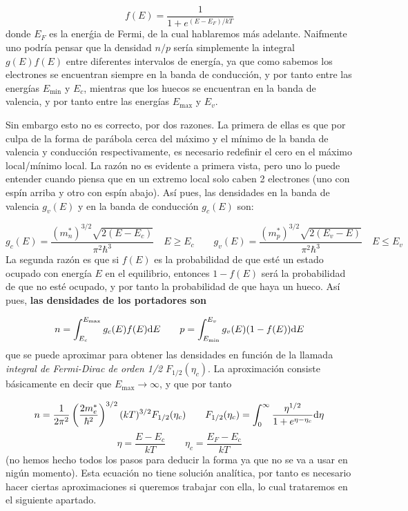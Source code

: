 \begin{equation}
	f(E) = \frac{1}{1+e^{(E-E_F)/kT}}
\end{equation}
donde $E_F$ es la enerǵia de Fermi, de la cual hablaremos más adelante. Naifmente uno podría pensar que la densidad $n/p$ sería simplemente la integral $g(E)f(E)$ entre diferentes intervalos de energía, ya que como sabemos los electrones se encuentran siempre en la banda de conducción, y por tanto entre las energías $E_{\min}$ y $E_c$, mientras que los huecos se encuentran en la banda de valencia, y por tanto entre las energías $E_{\max}$ y $E_v$.

Sin embargo esto no es correcto, por dos razones. La primera de ellas es que por culpa de la forma de parábola cerca del máximo y el mínimo de la banda de valencia y conducción respectivamente, es necesario redefinir el cero en el máximo local/mínimo local. La razón no es evidente a primera vista, pero uno lo puede entender cuando piensa que en un extremo local solo caben 2 electrones (uno con espín arriba y otro con espín abajo). Así pues, las densidades en la banda de valencia $g_v(E)$ y en la banda de conducción $g_c(E)$ son:

\begin{equation}
	g_c(E) = \frac{(m_n^*)^{3/2} \sqrt{2(E-E_c)}}{\pi^2 \hbar^3} \quad E \geq E_c \qquad 	g_v(E) = \frac{(m_p^*)^{3/2} \sqrt{2(E_v-E)}}{\pi^2 \hbar^3} \quad E \leq E_v
\end{equation}
La segunda razón es que si $f(E)$ es la probabilidad de que esté un estado ocupado con energía $E$ en el equilibrio, entonces $1-f(E)$ será la probabilidad de que no esté ocupado, y por tanto la probabilidad de que haya un hueco. Así pues, \textbf{las densidades de los portadores son}

\begin{equation}
	n=\int_{E_c}^{E_{\max}} g_c(E)f(E)\mathrm{d} E \qquad p = \int_{E_{\min}}^{E_v} g_v(E) (1-f(E))\mathrm{d} E
\end{equation}
que se puede aproximar para obtener las densidades en función de la llamada \textit{integral de Fermi-Dirac de orden 1/2} $F_{1/2}(\eta_c)$. La aproximación consiste básicamente en decir que $E_{\max} \rightarrow \infty$, y que por tanto

\begin{equation}
	n = \frac{1}{2\pi^2} \left( \frac{2m_e^*}{\hbar^2} \right)^{3/2} (kT)^{3/2} F_{1/2}(\eta_c) \qquad F_{1/2}(\eta_c) = \int_0^\infty \frac{\eta^{1/2}}{1+e^{\eta-\eta_c}}\mathrm{d} \eta
\end{equation}
\begin{equation}
	\eta=\frac{E-E_c}{kT} \qquad \eta_c= \frac{E_F-E_c}{kT}
\end{equation}
(no hemos hecho todos los pasos para deducir la forma ya que no se va a usar en nigún momento).
Esta ecuación no tiene solución analítica, por tanto es necesario hacer ciertas aproximaciones si queremos trabajar con ella, lo cual trataremos en el siguiente apartado.

